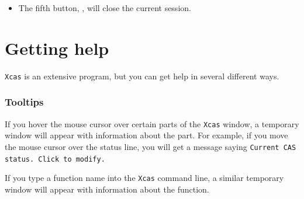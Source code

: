 \documentclass[a4paper,11pt]{book}
\begin{document}
\begin{itemize}
\begin{itemize}
    The \texttt{<{}<} and \texttt{>{}>} buttons will scroll through menu
    items.  Clicking on one of the menu buttons will perform the appropriate
    action or replace the menu items by submenu items.  When submenu
    items appear, there will also be a \texttt{BACK} button to return to
    the previous menu.  Clicking on the \texttt{home} button returns the
    menu buttons to the main menu.  
  
    After the menu buttons is a \texttt{var} button.  This will replace
    the menu buttons by buttons representing the variables that you have
    defined.  After that is a \texttt{cust} button, which will display
    commands that you store in a list variable \texttt{CST}.
  
    The last button, \texttt{X}, will close the menu bar.

    \item The \texttt{msg} key will bring up a message window at the bottom
    of the window which will give you helpful messages; for example, if
    you save a graphic, it will tell you the name of the file it is
    saved in and how to include it in a \LaTeX{} file.  

    \item The \texttt{abc} key will toggle the keyboard between the
    scientific keyboard and an alphabetic keyboard.
  \end{itemize}

  \item The fifth button, , will close the current
  session.
\end{itemize}

\section{Getting help}

\texttt{Xcas} is an extensive program, but you can get help in several
different ways.

\subsubsection{Tooltips}

If you hover the mouse cursor over certain parts of the \texttt{Xcas}
window, a temporary window will appear with information about the
part.  For example, if you move the mouse cursor over the status line,
you will get a message saying \texttt{Current CAS status.  Click to
modify.}

If you type a function name into the \texttt{Xcas} command line, a
similar temporary window will appear with information about the
function. 
\end{document}
